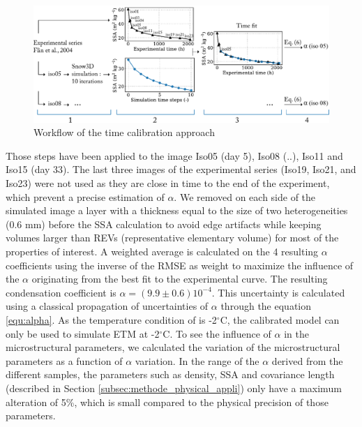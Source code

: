 \documentclass[draft,ms]{agujournal2019}
\begin{document}
\hspace*{-0.2cm}
\begin{figure}
    \centering
    \includegraphics[width = \linewidth]{Figures/workflow_aff.pdf}
    \caption{Workflow of the time calibration approach}
    \label{fig:workflow}
\end{figure}
Those steps have been applied to the image Iso05 (day 5), Iso08 (..), Iso11 and Iso15 (day 33). The last three images of the experimental series (Iso19, Iso21, and Iso23) were not used as they are close in time to the end of the experiment, which prevent a precise estimation of $\alpha$. %
We removed on each side of the simulated image a layer with a thickness equal to the size of two heterogeneities (0.6 mm) before the SSA calculation to avoid edge artifacts while keeping volumes larger than REVs (representative elementary volume) for most of the properties of interest. A weighted average is calculated on the 4 resulting $\alpha$ coefficients using the inverse of the RMSE as weight to maximize the influence of the $\alpha$ originating from the best fit to the experimental curve. The resulting condensation coefficient is $\alpha = ( 9.9 \pm 0.6) 10^{-4}$. This uncertainty is calculated using a classical propagation of uncertainties of $\alpha$ through the equation \eqref{equ:alpha}. As the temperature condition of  is -2$^\circ$C, the calibrated model can only be used to simulate ETM at -2$^\circ$C. To see the influence of $\alpha$ in the microstructural parameters, we calculated the variation of the microstructural parameters as a function of $\alpha$ variation. In the range of the $\alpha$ derived from the different samples, the parameters such as density, SSA and covariance length (described in Section \ref{subsec:methode_physical_appli}) only have a maximum alteration of 5\%, which is small compared to the physical precision of those parameters. 
\end{document}

